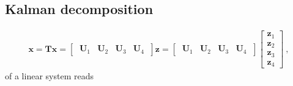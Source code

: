 \documentclass[letterpaper,10pt,english]{jupyterBook}
\begin{document}
\subsection{Kalman decomposition}
\label{\detokenize{ch/system-theory/coordinate-transformation:kalman-decomposition}}\label{\detokenize{ch/system-theory/coordinate-transformation:system-theory-coordinate-transformation-examples-kalman}}\begin{equation*}
\begin{split}\mathbf{x} = \mathbf{T} \mathbf{x} = \begin{bmatrix} \ \mathbf{U}_1 & \mathbf{U}_2 & \mathbf{U}_3 & \mathbf{U}_4 \ \end{bmatrix} \mathbf{z} = \begin{bmatrix} \ \mathbf{U}_1 & \mathbf{U}_2 & \mathbf{U}_3 & \mathbf{U}_4 \ \end{bmatrix} \begin{bmatrix} \mathbf{z}_1 \\ \mathbf{z}_2 \\ \mathbf{z}_3 \\ \mathbf{z}_4 \end{bmatrix} \ ,\end{split}
\end{equation*}
\sphinxAtStartPar
{\hyperref[\detokenize{ch/system-theory/kalman-decomposition:system-theory-kalman-decomposition-kalman}]{}} of a linear system reads
\end{document}
